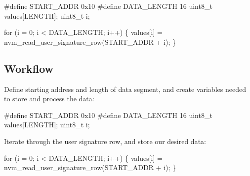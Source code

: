 \begin{DoxyCode}
\textcolor{preprocessor}{         #define START\_ADDR 0x10}
\textcolor{preprocessor}{}\textcolor{preprocessor}{         #define DATA\_LENGTH 16}
\textcolor{preprocessor}{}
         uint8\_t values[LENGTH];
         uint8\_t i;

         \textcolor{keywordflow}{for} (i = 0; i < DATA\_LENGTH; i++) \{
             values[i] = nvm\_read\_user\_signature\_row(START\_ADDR + i);
         \}
\end{DoxyCode}
\hypertarget{xmega_nvm_quickstart_nvm_quickstart_signature_case_workflow}{}\subsection{Workflow}\label{xmega_nvm_quickstart_nvm_quickstart_signature_case_workflow}

\begin{DoxyEnumerate}
\item Define starting address and length of data segment, and create variables needed to store and process the data\-:
\begin{DoxyItemize}
\item 
\begin{DoxyCode}
\textcolor{preprocessor}{               #define START\_ADDR 0x10}
\textcolor{preprocessor}{}\textcolor{preprocessor}{               #define DATA\_LENGTH 16}
\textcolor{preprocessor}{}
               uint8\_t values[LENGTH];
               uint8\_t i;
\end{DoxyCode}

\end{DoxyItemize}
\item Iterate through the user signature row, and store our desired data\-:
\begin{DoxyItemize}
\item 
\begin{DoxyCode}
        \textcolor{keywordflow}{for} (i = 0; i < DATA\_LENGTH; i++) \{
            values[i] = nvm\_read\_user\_signature\_row(START\_ADDR + i);
        \}
\end{DoxyCode}
 
\end{DoxyItemize}
\end{DoxyEnumerate}